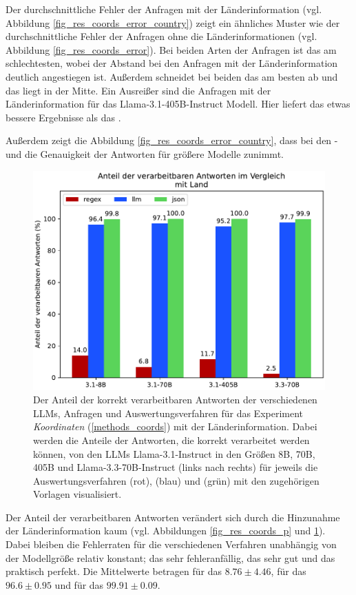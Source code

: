 Der durchschnittliche Fehler der Anfragen mit der Länderinformation (vgl. Abbildung \ref{fig_res_coords_error_country}) zeigt ein ähnliches Muster wie der durchschnittliche Fehler der Anfragen ohne die Länderinformationen (vgl. Abbildung \ref{fig_res_coords_error}).
Bei beiden Arten der Anfragen ist das \regexv{} am schlechtesten, wobei der Abstand bei den Anfragen mit der Länderinformation deutlich angestiegen ist.
Außerdem schneidet bei beiden das \llmv{} am besten ab und das \jsonv{} liegt in der Mitte.
Ein Ausreißer sind die Anfragen mit der Länderinformation für das Llama-3.1-405B-Instruct Modell.
Hier liefert das \jsonv{} etwas bessere Ergebnisse als das \llmv{}.

Außerdem zeigt die Abbildung \ref{fig_res_coords_error_country}, dass bei den \json{}- und \llmv{} die Genauigkeit der Antworten für größere Modelle zunimmt.

\begin{figure}[tb] %
    \centering
    \includegraphics[width=0.7\columnwidth]{img/country_p.pdf}
    \caption{Der Anteil der korrekt verarbeitbaren Antworten der verschiedenen LLMs, Anfragen und Auswertungsverfahren für das Experiment \textit{Koordinaten} (\ref{methods_coords}) mit der Länderinformation. Dabei werden die Anteile der Antworten, die korrekt verarbeitet werden können, von den LLMs Llama-3.1-Instruct in den Größen 8B, 70B, 405B und Llama-3.3-70B-Instruct (links nach rechts) für jeweils die Auswertungsverfahren \regex{} (rot), \llm{} (blau) und \json{} (grün) mit den zugehörigen Vorlagen visualisiert.}
    \label{fig_res_coords_p_country}
\end{figure}

Der Anteil der verarbeitbaren Antworten verändert sich durch die Hinzunahme der Länderinformation kaum (vgl. Abbildungen \ref{fig_res_coords_p} und \ref{fig_res_coords_p_country}).
Dabei bleiben die Fehlerraten für die verschiedenen Verfahren unabhängig von der Modellgröße relativ konstant; das \regexv{} sehr fehleranfällig, das \llmv{} sehr gut und das \jsonv{} praktisch perfekt.
Die Mittelwerte betragen für das \regexv{} \( \num{8.76} \pm \num{4.46} \), für das \llmv{} \( \num{96.6} \pm \num{0.95} \) und für das \jsonv{} \( \num{99.91} \pm \num{0.09} \).

